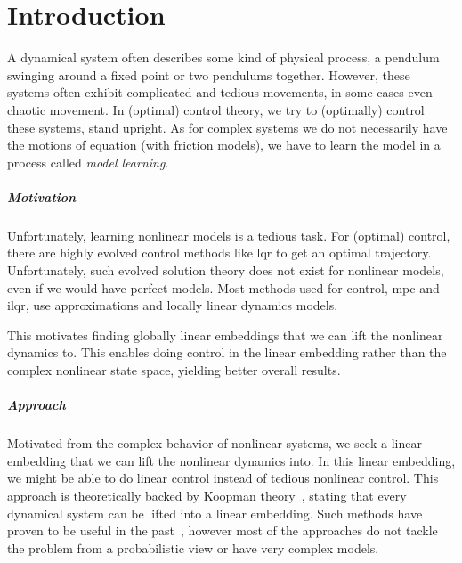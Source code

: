 \chapter{Introduction}
\label{c:introduction}



A dynamical system often describes some kind of physical process, \eg a pendulum swinging around a fixed point or two pendulums together. However, these systems often exhibit complicated and tedious movements, in some cases even chaotic movement. In (optimal) control theory, we try to (optimally) control these systems, \eg stand upright. As for complex systems we do not necessarily have the motions of equation (\eg with friction models), we have to learn the model in a process called \emph{model learning}.

\paragraph{Motivation}
	Unfortunately, learning nonlinear models is a tedious task. For (optimal) control, there are highly evolved control methods like \ac{lqr} to get an optimal trajectory. Unfortunately, such evolved solution theory does not exist for nonlinear models, even if we would have perfect models. Most methods used for control, \eg \ac{mpc} and \ac{ilqr}, use approximations and locally linear dynamics models.

	This motivates finding globally linear embeddings that we can lift the nonlinear dynamics to. This enables doing control in the linear embedding rather than the complex nonlinear state space, yielding better overall results.

\paragraph{Approach}
	Motivated from the complex behavior of nonlinear systems, we seek a linear embedding that we can lift the nonlinear dynamics into. In this linear embedding, we might be able to do linear control instead of tedious nonlinear control. This approach is theoretically backed by Koopman theory~\cite{koopmanHamiltonianSystemsTransformation1931}, stating that every dynamical system can be lifted into a linear embedding. Such methods have proven to be useful in the past~\cite{kaiserDatadrivenDiscoveryKoopman2020,hanDeepLearningKoopman2020,mortonDeepVariationalKoopman2019a}, however most of the approaches do not tackle the problem from a probabilistic view or have very complex models.

